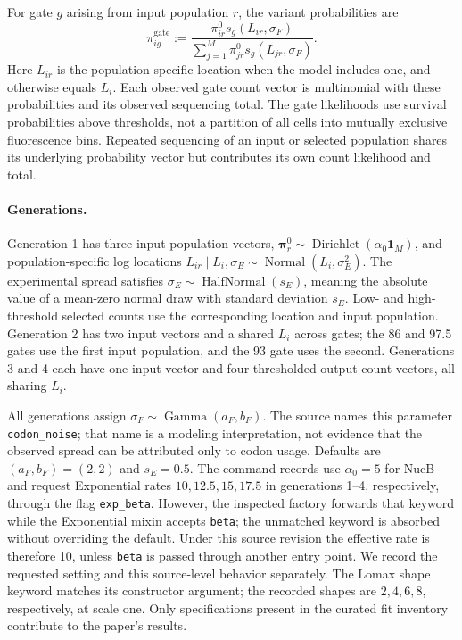 For gate $g$ arising from input population $r$, the variant probabilities
are
\[
\pi_{ig}^{\mathrm{gate}}:=
\frac{\pi_{ir}^0s_g(L_{ir},\sigma_F)}
{\sum_{j=1}^M\pi_{jr}^0s_g(L_{jr},\sigma_F)}.
\]
Here $L_{ir}$ is the population-specific location when the model includes
one, and otherwise equals $L_i$. Each observed gate count vector is
multinomial with these probabilities and its observed sequencing total.
The gate likelihoods use survival probabilities above thresholds, not a
partition of all cells into mutually exclusive fluorescence bins. Repeated
sequencing of an input or selected population shares its underlying probability
vector but contributes its own count likelihood and total.

\paragraph{Generations.}
Generation 1 has three input-population vectors,
$\boldsymbol\pi_r^0\sim\operatorname{Dirichlet}(\alpha_0\mathbf1_M)$,
and population-specific log locations
$L_{ir}\mid L_i,\sigma_E\sim\operatorname{Normal}(L_i,\sigma_E^2)$.
The experimental spread satisfies
$\sigma_E\sim\operatorname{HalfNormal}(s_E)$, meaning the absolute value
of a mean-zero normal draw with standard deviation $s_E$. Low- and high-threshold
selected counts use the corresponding location and input population.
Generation 2 has two input vectors and a shared $L_i$ across gates; the
86 and 97.5 gates use the first input population, and the 93 gate uses the
second. Generations 3 and 4 each have one input vector and four thresholded
output count vectors, all sharing $L_i$.

All generations assign
$\sigma_F\sim\operatorname{Gamma}(a_F,b_F)$. The source names this
parameter \texttt{codon\_noise}; that name is a modeling interpretation,
not evidence that the observed spread can be attributed only to codon usage.
Defaults are $(a_F,b_F)=(2,2)$ and $s_E=0.5$. The command records use
$\alpha_0=5$ for NucB and request Exponential rates $10,12.5,15,17.5$ in
generations 1--4, respectively, through the flag \texttt{exp\_beta}.
However, the inspected factory forwards that keyword while the Exponential
mixin accepts \texttt{beta}; the unmatched keyword is absorbed without
overriding the default. Under this source revision the effective rate is
therefore 10, unless \texttt{beta} is passed through another entry point.
We record the requested setting and this source-level behavior separately.
The Lomax shape keyword matches its constructor argument; the recorded shapes
are $2,4,6,8$, respectively, at scale one.
Only specifications present in the curated fit inventory contribute to the
paper's results.

